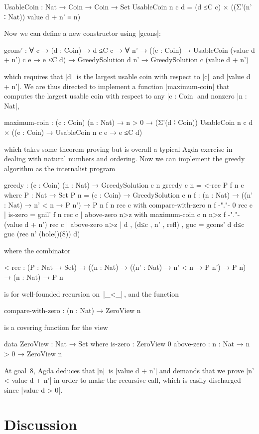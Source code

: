 \begin{code}
UsableCoin : Nat → Coin → Coin → Set
UsableCoin n c d =
  (d ≤C c) × ((Σ'(n' ∶ Nat)) value d + n' ≡ n)
\end{code}
Now we can define a new constructor using |gcons|:
\begin{code}
gcons' :
  ∀ {c} → (d : Coin) → d ≤C c →
  ∀ {n'} →
  ((e : Coin) → UsableCoin (value d + n') c e → e ≤C d) →
  GreedySolution d n' → GreedySolution c (value d + n')
\end{code}
which requires that |d|~is the largest usable coin with respect to |c|~and |value d + n'|.
We are thus directed to implement a function |maximum-coin| that computes the largest usable coin with respect to any |c : Coin| and nonzero |n : Nat|,
\begin{code}maximum-coin :
  (c : Coin) (n : Nat) → n > 0 →
  (Σ'(d ∶ Coin))  UsableCoin n c d ×
                 ((e : Coin) → UsableCoin n c e → e ≤C d)
\end{code}which takes some theorem proving but is overall a typical Agda exercise in dealing with natural numbers and ordering.
Now we can implement the greedy algorithm as the internalist program
\begin{code}
greedy : (c : Coin) (n : Nat) → GreedySolution c n
greedy c n = <-rec P f n c
  where
    P : Nat → Set
    P n = (c : Coin) → GreedySolution c n
    f : (n : Nat) → ((n' : Nat) → n' < n → P n') → P n
    f          n               rec  c  with compare-with-zero n 
    f {-"."-}  0               rec  c  | is-zero = gnil'
    f          n               rec  c  | above-zero n>z
                                       with maximum-coin c n n>z
    f {-"."-}  (value d + n')  rec  c  | above-zero n>z
                                       | d , (d≤c , n' , refl) , guc =
                                         gcons' d d≤c guc (rec n' (hole()(8)) d)
\end{code}
where the combinator
\begin{code}<-rec :  (P : Nat → Set) →
         ((n : Nat) → ((n' : Nat) → n' < n → P n') → P n) →
         (n : Nat) → P n
\end{code}is for well-founded recursion on~|_<_|\,, and the function
\begin{code}compare-with-zero : (n : Nat) → ZeroView n
\end{code}is a covering function for the view
\begin{code}
data ZeroView : Nat → Set where
  is-zero     :  ZeroView 0
  above-zero  :  {n : Nat} → n > 0 → ZeroView n
\end{code}
At goal~8, Agda deduces that |n|~is |value d + n'| and demands that we prove |n' < value d + n'| in order to make the recursive call, which is easily discharged since |value d > 0|.

\section{Discussion}

